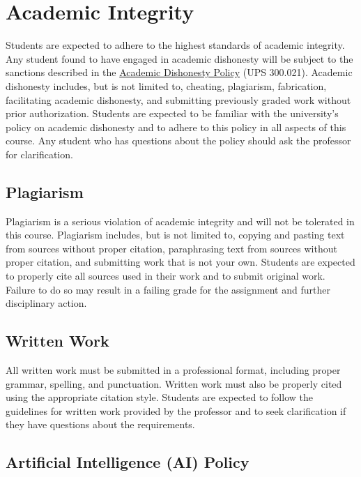 \documentclass[12pt]{article}     %
\begin{document}
	\section{Academic Integrity}
	Students are expected to adhere to the highest standards of academic integrity. Any student found to have engaged in academic dishonesty will be subject to the sanctions described in the \href{https://www.fullerton.edu/senate/publications_policies_resolutions/ups/UPS%20300/UPS%20300.021.pdf}{Academic Dishonesty Policy} (UPS 300.021). Academic dishonesty includes, but is not limited to, cheating, plagiarism, fabrication, facilitating academic dishonesty, and submitting previously graded work without prior authorization. Students are expected to be familiar with the university's policy on academic dishonesty and to adhere to this policy in all aspects of this course. Any student who has questions about the policy should ask the professor for clarification.
	
	\subsection*{Plagiarism}
	Plagiarism is a serious violation of academic integrity and will not be tolerated in this course. Plagiarism includes, but is not limited to, copying and pasting text from sources without proper citation, paraphrasing text from sources without proper citation, and submitting work that is not your own. Students are expected to properly cite all sources used in their work and to submit original work. Failure to do so may result in a failing grade for the assignment and further disciplinary action.
	
	\subsection*{Written Work}
	All written work must be submitted in a professional format, including proper grammar, spelling, and punctuation. Written work must also be properly cited using the appropriate citation style. Students are expected to follow the guidelines for written work provided by the professor and to seek clarification if they have questions about the requirements.

	\subsection*{Artificial Intelligence (AI) Policy}
\end{document}
